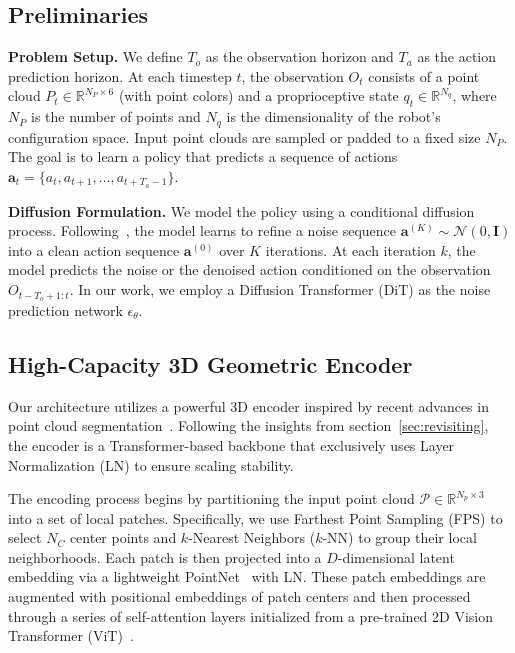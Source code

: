 \documentclass[runningheads]{llncs}
\begin{document}
\subsection{Preliminaries}
\label{sec:preliminaries}
\noindent\textbf{Problem Setup.} We define $T_o$ as the observation horizon and $T_a$ as the action prediction horizon. At each timestep $t$, the observation $O_t$ consists of a point cloud $P_t \in \mathbb{R}^{N_P \times 6}$ (with point colors) and a proprioceptive state $q_t \in \mathbb{R}^{N_q}$, where $N_P$ is the number of points and $N_q$ is the dimensionality of the robot's configuration space. Input point clouds are sampled or padded to a fixed size $N_P$. The goal is to learn a policy that predicts a sequence of actions $\mathbf{a}_t = \{a_t, a_{t+1}, \dots, a_{t+T_a-1}\}$.

\noindent\textbf{Diffusion Formulation.} We model the policy using a conditional diffusion process. Following~\cite{chi2024diffusionpolicyvisuomotorpolicy}, the model learns to refine a noise sequence $\mathbf{a}^{(K)} \sim \mathcal{N}(0, \mathbf{I})$ into a clean action sequence $\mathbf{a}^{(0)}$ over $K$ iterations. At each iteration $k$, the model predicts the noise or the denoised action conditioned on the observation $O_{t-T_o+1:t}$. In our work, we employ a Diffusion Transformer (DiT) as the noise prediction network $\epsilon_\theta$.

\subsection{High-Capacity 3D Geometric Encoder}
\label{sec:encoder}
Our architecture utilizes a powerful 3D encoder inspired by recent advances in point cloud segmentation~\cite{zhou2024point}. Following the insights from section~\ref{sec:revisiting}, the encoder is a Transformer-based backbone that exclusively uses Layer Normalization (LN) to ensure scaling stability. 

The encoding process begins by partitioning the input point cloud $\mathcal{P} \in \mathbb{R}^{N_p \times 3}$ into a set of local patches. Specifically, we use Farthest Point Sampling (FPS) to select $N_C$ center points and $k$-Nearest Neighbors ($k$-NN) to group their local neighborhoods. Each patch is then projected into a $D$-dimensional latent embedding via a lightweight PointNet~\cite{qi2017pointnet} with LN. These patch embeddings are augmented with positional embeddings of patch centers and then processed through a series of self-attention layers initialized from a pre-trained 2D Vision Transformer (ViT)~\cite{dosovitskiy2020image}.
\end{document}
